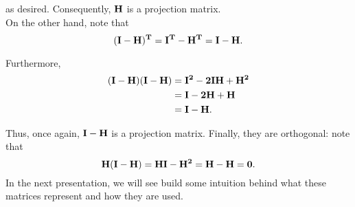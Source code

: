 \begin{enumerate}[a)]
as desired. Consequently, $\bf{H}$ is a projection matrix.\\

On the other hand, note that 
\[
    (\bf{I} - \bf{H})^T = \bf{I}^T - \bf{H}^T = \bf{I} - \bf{H}.
\]

Furthermore, 
\begin{align*}
    (\bf{I} - \bf{H})(\bf{I} - \bf{H}) &= \bf{I}^2 - 2 \bf{I}\bf{H} + \bf{H}^2 \\
    &= \bf{I} - 2\bf{H} + \bf{H} \\
    &= \bf{I} - \bf{H}.
\end{align*}

Thus, once again, $\bf{I} - \bf{H}$ is a projection matrix. Finally, they are orthogonal: note that
\[
    \bf{H}(\bf{I} - \bf{H}) = \bf{H} \bf{I} - \bf{H}^2 = \bf{H} - \bf{H} = 0.
\]
In the next presentation, we will see build some intuition behind what these matrices represent and how they are used.
\end{enumerate}
